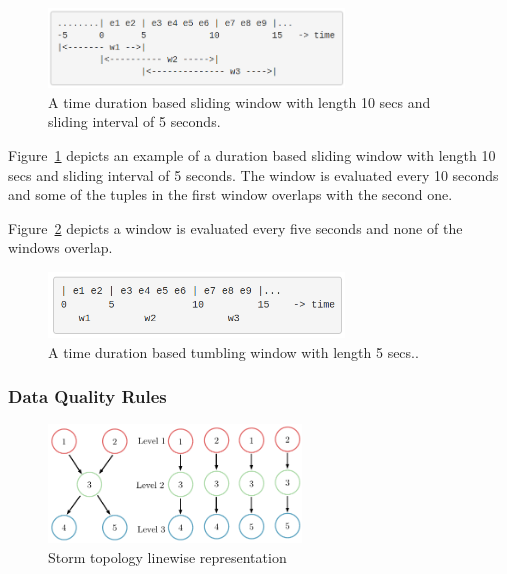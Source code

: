 \begin{figure}[h!]
  \centering
  \includegraphics[width=0.7\textwidth]{Figures/SlidingWindow.png}
  \caption{A time duration based sliding window with length 10 secs and sliding interval of 5 seconds.}
  \label{fig:SlideBolt}
\end{figure}

Figure~\ref{fig:SlideBolt} depicts an example of a duration based sliding window with length 10 secs and sliding interval of 5 seconds. The window is evaluated every 10 seconds and some of the tuples in the first window overlaps with the second one. 

Figure~\ref{fig:TumbBolt} depicts a window is evaluated every five seconds and none of the windows overlap.

\begin{figure}[h!]
  \centering
  \includegraphics[width=0.7\textwidth]{Figures/TumblingWindow.png}
  \caption{A time duration based tumbling window with length 5 secs..}
  \label{fig:TumbBolt}
\end{figure}


\subsubsection{Data Quality Rules}

\begin{figure}[h!]
  \centering
  \includegraphics[width=0.6\textwidth]{Figures/AlgoImg.pdf}
  \caption{Storm topology linewise representation}
  \label{fig:AlgoImg}
\end{figure}

